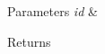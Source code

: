 
\begin{DoxyParams}{Parameters}
{\em id} & \\
\hline
\end{DoxyParams}
\begin{DoxyReturn}{Returns}

\end{DoxyReturn}
